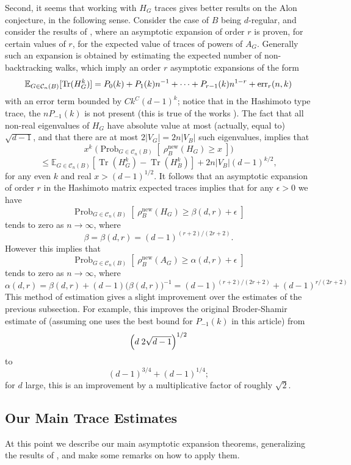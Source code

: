 \documentclass{memo-l}
\theoremstyle{plain}
\theoremstyle{definition}
\numberwithin{section}{chapter}
\numberwithin{equation}{chapter}
\newcommand{\prob}[2]{{\Prob}_{#1}{\left[\; #2\; \right]}}
\DeclareMathOperator{\Tr}{Tr}
\DeclareMathOperator{\Prob}{Prob}
\newcommand{\rhonew}{\rho^{\mathrm{new}}}
\theoremstyle{plain}
\theoremstyle{definition}
\newcommand\EE{\mathbb{E}}
\newcommand\cC{\mathcal{C}}
\begin{document}
{Second, it seems that working with $H_G$ traces gives better results
on the Alon conjecture, in the following sense.
Consider the case of $B$ being $d$-regular, and
consider the results of 
\cite{broder,friedman_random_graphs,friedman_relative}, where
an asymptotic expansion of order $r$ is proven, for certain values of
$r$, for the expected value of traces of powers of $A_G$.  Generally
such an expansion is obtained by estimating the expected number of
non-backtracking walks, which imply an order $r$ asymptotic expansions
of the form
$$
\EE_{G \in \cC_n(B)}[ \Tr(H_G^k) ] = 
P_0(k) + P_1(k) n^{-1} + \cdots + P_{r-1}(k)
n^{1-r} + {\rm err}_r(n,k) 
$$
with an error term bounded by $Ck^C(d-1)^k$; notice that in the Hashimoto
type trace, the $nP_{-1}(k)$ is not present
(this is true of the works
\cite{broder,friedman_random_graphs,friedman_relative}).
The fact that all non-real eigenvalues of $H_G$ have absolute value
at most (actually, equal to) $\sqrt{d-1}$, and that there are at most
$2|V_G|=2n|V_B|$ such eigenvalues, implies that
$$
x^k\;\biggl(\prob{G\in \cC_n(B)}{\rhonew_B(H_G) \ge x}\biggr)
$$
$$
\le 
\EE_{G \in \cC_n(B)}[ \Tr(H_G^k) -\Tr(H_B^k) ] 
+2n|V_B|(d-1)^{k/2},
$$
for any even $k$ and real $x> (d-1)^{1/2}$.
It follows that an asymptotic expansion of order $r$
in the Hashimoto matrix expected traces implies that
for any $\epsilon>0$ we have
$$
\prob{G\in \cC_n(B)}{\rhonew_B(H_G) \ge \beta(d,r) + \epsilon}
$$
tends to zero as $n\to\infty$, where
$$
\beta = \beta(d,r) = (d-1)^{(r+2)/(2r+2)}.
$$
However this implies that
$$
\prob{G\in \cC_n(B)}{\rhonew_B(A_G) \ge \alpha(d,r) + \epsilon}
$$
tends to zero as $n\to\infty$, where
$$
\alpha(d,r) = \beta(d,r) + (d-1) \bigl( \beta(d,r) \bigr)^{-1}
= (d-1)^{(r+2)/(2r+2)} + (d-1)^{r/(2r+2)} 
$$
This method of estimation gives a slight improvement over the
estimates of the previous subsection.
For example, this improves the original Broder-Shamir estimate of
\cite{broder} (assuming one uses the best bound for $P_{-1}(k)$ in this
article) from
$$
\Bigl( d\; 2\sqrt{d-1}\Bigr)^{1/2} 
$$
to
$$
(d-1)^{3/4} + (d-1)^{1/4};
$$
for $d$ large, this is an improvement by a multiplicative factor
of roughly $\sqrt{2}$.



\subsection{Our Main Trace Estimates}

At this point we describe our main asymptotic expansion theorems,
generalizing the results of \cite{friedman_alon}, and make some
remarks on how to apply them.

}
\end{document}
